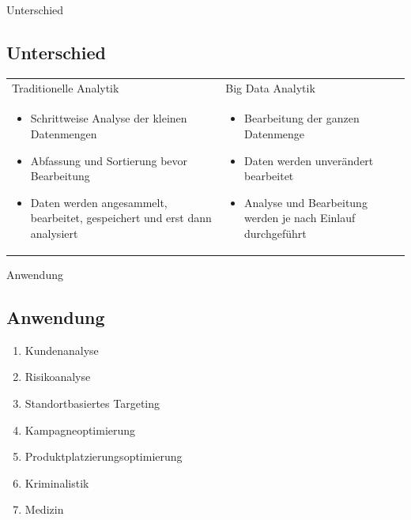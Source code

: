 \documentclass[11pt]{beamer}
\begin{document}
\begin{frame}{Unterschied}
\subsection{Unterschied}
\setlength\tabcolsep{0pt}
\setlength\thickmuskip{0mu}
\setlength\medmuskip{0mu}
\small
\centering
\begin{tabular*}{\textwidth}{ p{145pt} p{145pt}} 
Traditionelle Analytik & Big Data Analytik \\ 
\begin{itemize}
\item Schrittweise Analyse der kleinen Datenmengen
\item Abfassung und Sortierung bevor Bearbeitung
\item Daten werden angesammelt, bearbeitet, gespeichert und erst dann analysiert 
\end{itemize}
&
\begin{itemize}
\item Bearbeitung der ganzen Datenmenge 
\item Daten werden unverändert bearbeitet
\item Analyse und Bearbeitung werden je nach Einlauf durchgeführt 
\end{itemize}

\end{tabular*} 
\end{frame}

\begin{frame}{Anwendung}
\subsection{Anwendung}
	\begin{enumerate}
		\item Kundenanalyse
		\item Risikoanalyse
		\item Standortbasiertes Targeting
		\item Kampagneoptimierung
		\item Produktplatzierungsoptimierung
		\item Kriminalistik
		\item Medizin
	\end{enumerate}
\end{frame}
\end{document}
